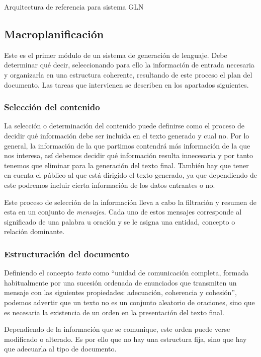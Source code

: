 %
{Arquitectura de referencia para sistema GLN \citep{vicente2015generacion}}

\subsection{Macroplanificación}
Este es el primer módulo de un sistema de generación de lenguaje. Debe determinar qué decir, seleccionando para ello la información de entrada necesaria y organizarla en una estructura coherente, resultando de este proceso el plan del documento. Las tareas que intervienen se describen en los apartados siguientes. 

\subsubsection{Selección del contenido}
La selección o determinación del contenido puede definirse como el proceso de decidir qué información debe ser incluida en el texto generado y cual no. Por lo general, la información de la que partimos contendrá más información de la que nos interesa, así debemos decidir qué información resulta innecesaria y por tanto tenemos que eliminar para la generación del texto final. También hay que tener en cuenta el público al que está dirigido el texto generado, ya que dependiendo de este podremos incluir cierta información de los datos entrantes o no.

Este proceso de selección de la información lleva a cabo la filtración y resumen de esta en un conjunto de \textit{mensajes}. Cada uno de estos mensajes corresponde al significado de una palabra u oración y se le asigna una entidad, concepto o relación dominante.

\subsubsection{Estructuración del documento}
Definiendo el concepto \textit{texto} como ``unidad de comunicación completa, formada habitualmente por una sucesión ordenada de enunciados que transmiten un mensaje con las siguientes propiedades: adecuación, coherencia y cohesión'', podemos advertir que un texto no es un conjunto aleatorio de oraciones, sino que es necesaria la existencia de un orden en la presentación del texto final.

Dependiendo de la información que se comunique, este orden puede verse modificado o alterado. Es por ello que no hay una estructura fija, sino que hay que adecuarla al tipo de documento.


